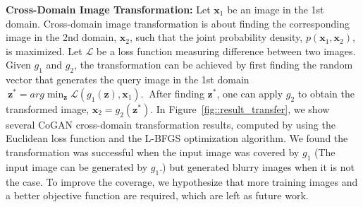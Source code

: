 {\bf Cross-Domain Image Transformation:} Let $\mathbf{x}_1$ be an image in the 1st domain. Cross-domain image transformation is about finding the corresponding image in the 2nd domain, $\mathbf{x}_2$, such that the joint probability density, $p(\mathbf{x}_1,\mathbf{x}_2)$, is maximized. Let $\mathcal{L}$ be a loss function measuring difference between two images. Given $g_1$ and $g_2$, the transformation can be achieved by first finding the random vector that generates the query image in the 1st domain 
$\medspace
\mathbf{z}^* = arg\min_{\mathbf{z}} \mathcal{L}(g_1(\mathbf{z}),\mathbf{x}_1).\label{eqn::domain_trans}
\medspace$
After finding $\mathbf{z}^*$, one can apply $g_2$ to obtain the transformed image, $\mathbf{x}_2=g_2(\mathbf{z}^*)$. In Figure~\ref{fig::result_transfer}, we show several CoGAN cross-domain transformation results, computed by using the Euclidean loss function and the L-BFGS optimization algorithm. We found the transformation was successful when the input image was covered by $g_1$ (The input image can be generated by $g_1$.) but generated blurry images when it is not the case. To improve the coverage, we hypothesize that more training images and a better objective function are required, which are left as future work.


